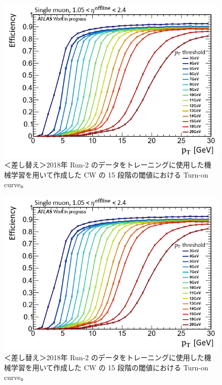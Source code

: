\begin{figure}[tb]
  \centering
  \includegraphics[clip, width=12cm]{fig/4/v07_15_Eff.png}
  \caption{＜差し替え＞2018年 Run-2 のデータをトレーニングに使用した機械学習を用いて作成した CW の 15 段階の閾値における Turn-on curve。}
  \label{fig:15Eff_CW_Data}
\end{figure}

\begin{figure}[tb]
  \centering
  \includegraphics[clip, width=12cm]{fig/4/v07_15_Eff.png}
  \caption{＜差し替え＞2018年 Run-2 のデータをトレーニングに使用した機械学習を用いて作成した CW の 15 段階の閾値における Turn-on curve。}
  \label{fig:15Eff_CW_Data}
\end{figure}

